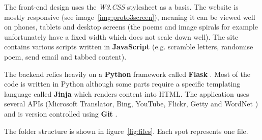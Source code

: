 The front-end design uses the \textit{W3.CSS} stylesheet \autocite{w3css} as a basis. The website is mostly responsive (see image~\ref{img:proto3screen}), meaning it can be viewed well on phones, tablets and desktop screens (the poems and image spirals for example unfortunately have a fixed width which does not scale down well). The site contains various scripts written in \textbf{JavaScript} (e.g. scramble letters, randomise poem, send email and tabbed content).

The backend relies heavily on a \textbf{Python} \autocite{pythonmain} framework called \textbf{Flask} \autocite{Ronacher2016}. Most of the code is written in Python although some parts require a specific templating language called \textbf{Jinja} \autocite{Jinja2016} which renders content into \ac{HTML}. The application uses several \acs{API}s (Microsoft Translator, Bing, YouTube, Flickr, Getty and WordNet \autocite{TranslatorAPI,BingAPI,YouTubeAPI,FlickrAPI,GettyAPI,Princeton2010,NLTK2016}) and is version controlled using \textbf{Git} \autocite{Git2016}.

The folder structure is shown in figure~\ref{fig:files}. Each spot represents one file.

